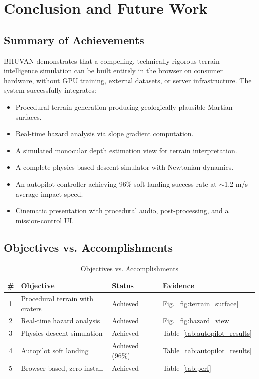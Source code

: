 \chapter{Conclusion and Future Work}

\section{Summary of Achievements}
BHUVAN demonstrates that a compelling, technically rigorous terrain intelligence simulation can be built entirely in the browser on consumer hardware, without GPU training, external datasets, or server infrastructure. The system successfully integrates:

\begin{itemize}
    \item Procedural terrain generation producing geologically plausible Martian surfaces.
    \item Real-time hazard analysis via slope gradient computation.
    \item A simulated monocular depth estimation view for terrain interpretation.
    \item A complete physics-based descent simulator with Newtonian dynamics.
    \item An autopilot controller achieving 96\% soft-landing success rate at $\sim$1.2 m/s average impact speed.
    \item Cinematic presentation with procedural audio, post-processing, and a mission-control UI.
\end{itemize}

\section{Objectives vs. Accomplishments}

\begin{table}[h]
\centering
\caption{Objectives vs. Accomplishments}
\label{tab:obj_vs_acc}
\begin{tabular}{|c|p{6cm}|p{3cm}|p{2.5cm}|}
\hline
\textbf{\#} & \textbf{Objective} & \textbf{Status} & \textbf{Evidence} \\
\hline
1 & Procedural terrain with craters & Achieved & Fig.~\ref{fig:terrain_surface} \\
\hline
2 & Real-time hazard analysis & Achieved & Fig.~\ref{fig:hazard_view} \\
\hline
3 & Physics descent simulation & Achieved & Table~\ref{tab:autopilot_results} \\
\hline
4 & Autopilot soft landing & Achieved (96\%) & Table~\ref{tab:autopilot_results} \\
\hline
5 & Browser-based, zero install & Achieved & Table~\ref{tab:perf} \\
\hline
\end{tabular}
\end{table}

